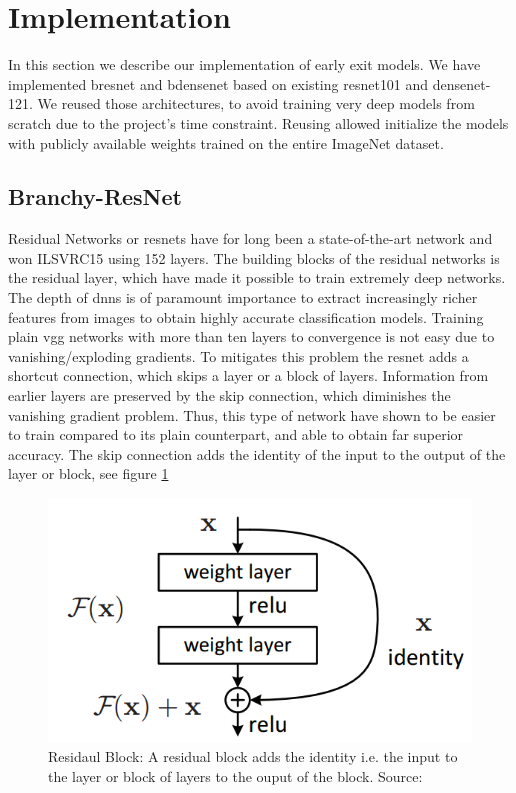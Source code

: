\section{Implementation} \label{sec:ee-implementation}

In this section we describe our implementation of early exit models. We have implemented \gls{bresnet} and \gls{bdensenet} based on existing \gls{resnet}101 and \gls{densenet}-121. We reused those architectures, to avoid training very deep models from scratch due to the project's time constraint. Reusing allowed initialize the models with publicly available weights trained on the entire ImageNet dataset.

\subsection{Branchy-ResNet} 

Residual Networks or \gls{resnet}s \cite{he_deep_2015} have for long been a state-of-the-art network and won ILSVRC15 using 152 layers. The building blocks of the residual networks is the residual layer, which have made it possible to train extremely deep networks. The depth of \gls{dnn}s is of paramount importance to extract increasingly richer features from images to obtain highly accurate classification models. Training plain \gls{vgg} networks \cite{simonyan_very_2015} with more than ten layers to convergence is not easy due to vanishing/exploding gradients. To mitigates this problem the \gls{resnet} adds a shortcut connection, which skips a layer or a block of layers. Information from earlier layers are preserved by the skip connection, which diminishes the vanishing gradient problem. Thus, this type of network have shown to be easier to train compared to its plain counterpart, and able to obtain far superior accuracy. The skip connection adds the identity of the input to the output of the layer or block, see figure \ref{fig:residualblock}

\begin{figure}
	\centering
	\includegraphics[width=.5\linewidth]{figures/models/residualblock}
	\caption[Residual Block]{Residaul Block: A residual block adds the identity i.e. the input to the layer or block of layers to the ouput of the block. Source:  \cite{he_deep_2015}}
	\label{fig:residualblock}
\end{figure}


